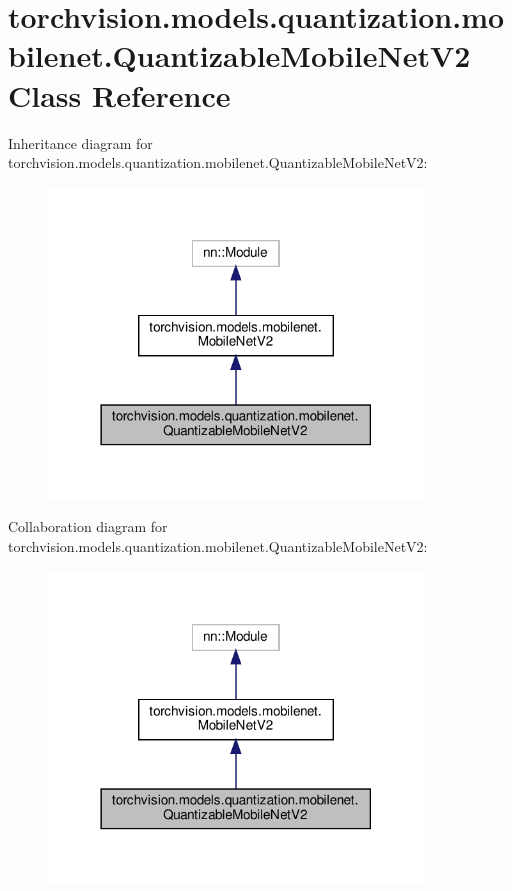 \hypertarget{classtorchvision_1_1models_1_1quantization_1_1mobilenet_1_1QuantizableMobileNetV2}{}\section{torchvision.\+models.\+quantization.\+mobilenet.\+Quantizable\+Mobile\+Net\+V2 Class Reference}
\label{classtorchvision_1_1models_1_1quantization_1_1mobilenet_1_1QuantizableMobileNetV2}


Inheritance diagram for torchvision.\+models.\+quantization.\+mobilenet.\+Quantizable\+Mobile\+Net\+V2\+:
\nopagebreak
\begin{figure}[H]
\begin{center}
\leavevmode
\includegraphics[width=282pt]{classtorchvision_1_1models_1_1quantization_1_1mobilenet_1_1QuantizableMobileNetV2__inherit__graph}
\end{center}
\end{figure}


Collaboration diagram for torchvision.\+models.\+quantization.\+mobilenet.\+Quantizable\+Mobile\+Net\+V2\+:
\nopagebreak
\begin{figure}[H]
\begin{center}
\leavevmode
\includegraphics[width=282pt]{classtorchvision_1_1models_1_1quantization_1_1mobilenet_1_1QuantizableMobileNetV2__coll__graph}
\end{center}
\end{figure}

